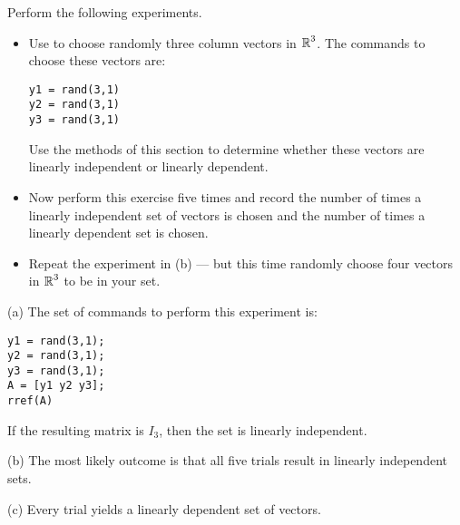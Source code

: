 \documentclass{ximera}
\begin{document}
\begin{computerExercise} \label{c5.4.9}
Perform the following experiments.
\begin{itemize}
\item[(a)]   Use \Matlab to choose randomly three column vectors in
$\mbox{$\Bbb{R}$}^3$.  The \Matlab commands to choose these vectors are:
\begin{verbatim}
y1 = rand(3,1)
y2 = rand(3,1)
y3 = rand(3,1)
\end{verbatim}
Use the methods of this section to determine whether these vectors
are linearly independent or linearly dependent.
\item[(b)]  Now perform this exercise five times and record the number
of times a linearly independent set of vectors is chosen and the
number of times a linearly dependent set is chosen.
\item[(c)]  Repeat the experiment in (b) --- but this time randomly
choose four vectors in $\mbox{$\Bbb{R}$}^3$ to be in your set.
\end{itemize}

\begin{solution}

(a) The set of commands to perform this experiment is:
\begin{verbatim}
y1 = rand(3,1);
y2 = rand(3,1);
y3 = rand(3,1);
A = [y1 y2 y3];
rref(A)
\end{verbatim}
If the resulting matrix is $I_3$, then the set is linearly
independent.

(b) The most likely outcome is that all five trials result in
linearly independent sets.

(c) Every trial yields a linearly dependent set of vectors.



\end{solution}
\end{computerExercise}
\end{document}
